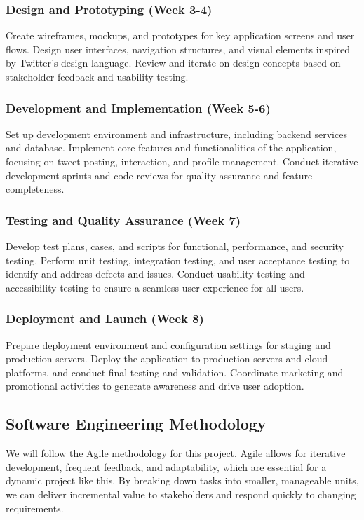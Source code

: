 \documentclass{article}
\begin{document}
\subsubsection{Design and Prototyping (Week 3-4)}
Create wireframes, mockups, and prototypes for key application screens and user flows. Design user interfaces, navigation structures, and visual elements inspired by Twitter's design language. Review and iterate on design concepts based on stakeholder feedback and usability testing.
\subsubsection{Development and Implementation (Week 5-6)}
Set up development environment and infrastructure, including backend services and database. Implement core features and functionalities of the application, focusing on tweet posting, interaction, and profile management. Conduct iterative development sprints and code reviews for quality assurance and feature completeness.
\subsubsection{Testing and Quality Assurance (Week 7)}
Develop test plans, cases, and scripts for functional, performance, and security testing. Perform unit testing, integration testing, and user acceptance testing to identify and address defects and issues. Conduct usability testing and accessibility testing to ensure a seamless user experience for all users.
\subsubsection{Deployment and Launch (Week 8)}
Prepare deployment environment and configuration settings for staging and production servers. Deploy the application to production servers and cloud platforms, and conduct final testing and validation. Coordinate marketing and promotional activities to generate awareness and drive user adoption.

\subsection{Software Engineering Methodology}
We will follow the Agile methodology for this project. Agile allows for iterative development, frequent feedback, and adaptability, which are essential for a dynamic project like this. By breaking down tasks into smaller, manageable units, we can deliver incremental value to stakeholders and respond quickly to changing requirements.
\end{document}
